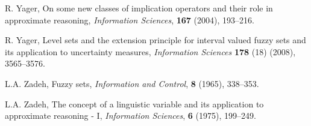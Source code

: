 \documentclass[12pt]{article}
\theoremstyle{plain}
\theoremstyle{remark}
\theoremstyle{definition}
\theoremstyle{proposition}
\begin{document}
\begin{thebibliography}{8}
{
R. Yager, On some new classes of implication operators and their role in
  approximate reasoning, \emph{Information Sciences}, \textbf{167} (2004),  193--216.

 R. Yager, Level sets and the extension principle for interval
valued fuzzy sets and its application to uncertainty measures,
 \emph{Information Sciences} \textbf{178} (18) (2008), 3565--3576.

L.A. Zadeh, Fuzzy sets, \emph{Information and Control}, \textbf{8} (1965),  338--353.


L.A. Zadeh, The concept of a linguistic variable and its application to
  approximate reasoning - {I}, \emph{Information Sciences}, \textbf{6} (1975),  199--249.}


\end{thebibliography}

\end{document}
